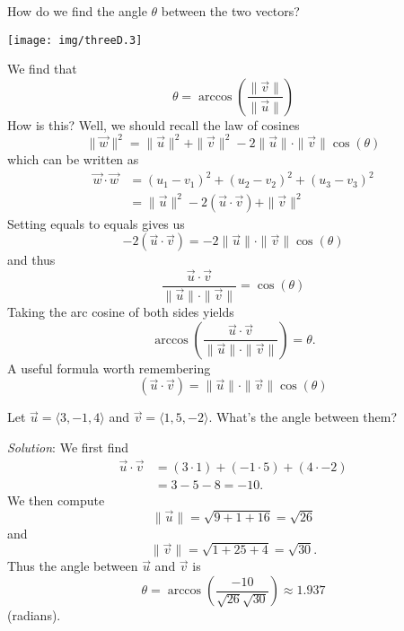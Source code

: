 How do we find the angle $\theta$ between the two vectors?
\begin{center}
\texttt{[image: img/threeD.3]}
\end{center}
We find that
\begin{equation}
\theta = \arccos\left(\frac{\|\vec{v}\|}{\|\vec{u}\|}\right)
\end{equation}
How is this? Well, we should recall the law of cosines
\begin{equation}
\|\vec{w}\|^{2}=\|\vec{u}\|^{2}+\|\vec{v}\|^{2}-2\|\vec{u}\|\cdot\|\vec{v}\|\cos(\theta)
\end{equation}
which can be written as
\begin{equation}
\begin{aligned}
\vec{w}\cdot\vec{w} &=
(u_{1}-v_{1})^{2}+(u_{2}-v_{2})^{2}+(u_{3}-v_{3})^{2}\\
&= \|\vec{u}\|^{2}-2(\vec{u}\cdot\vec{v})+\|\vec{v}\|^{2}
\end{aligned}
\end{equation}
Setting equals to equals gives us
\begin{equation}
-2(\vec{u}\cdot\vec{v})=-2\|\vec{u}\|\cdot\|\vec{v}\|\cos(\theta)
\end{equation}
and thus
\begin{equation}
\frac{\vec{u}\cdot\vec{v}}{\|\vec{u}\|\cdot\|\vec{v}\|}=\cos(\theta)
\end{equation}
Taking the arc cosine of both sides yields
\begin{equation}
\arccos\left(\frac{\vec{u}\cdot\vec{v}}{\|\vec{u}\|\cdot\|\vec{v}\|}\right)=\theta.
\end{equation}
A useful formula worth remembering 
\begin{equation}
(\vec{u}\cdot\vec{v})=\|\vec{u}\|\cdot\|\vec{v}\|\cos(\theta)
\end{equation}
\begin{example}
Let $\vec{u}=\langle3,-1,4\rangle$ and
$\vec{v}=\langle1,5,-2\rangle$. What's the angle between them?

\emph{Solution}: We first find
\begin{equation}
\begin{aligned}
\vec{u}\cdot\vec{v} &= (3\cdot1)+(-1\cdot5)+(4\cdot-2)\\
&=3-5-8=-10.
\end{aligned}
\end{equation}
We then compute
\begin{equation}
\|\vec{u}\|=\sqrt{9+1+16}=\sqrt{26}
\end{equation}
and
\begin{equation}
\|\vec{v}\|=\sqrt{1+25+4}=\sqrt{30}.
\end{equation}
Thus the angle between $\vec{u}$ and $\vec{v}$ is
\begin{equation}
\theta=\arccos\left(\frac{-10}{\sqrt{26}\sqrt{30}}\right)\approx1.937
\end{equation}
(radians).
\end{example}

